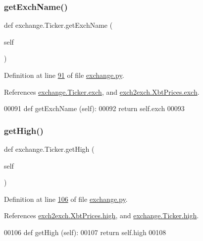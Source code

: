 \subsubsection{\texorpdfstring{get\+Exch\+Name()}{getExchName()}}
{\footnotesize\ttfamily def exchange.\+Ticker.\+get\+Exch\+Name (\begin{DoxyParamCaption}\item[{}]{self }\end{DoxyParamCaption})}



Definition at line \hyperlink{exchange_8py_source_l00091}{91} of file \hyperlink{exchange_8py_source}{exchange.\+py}.



References \hyperlink{exchange_8py_source_l00057}{exchange.\+Ticker.\+exch}, and \hyperlink{exch2exch_8py_source_l00064}{exch2exch.\+Xbt\+Prices.\+exch}.


\begin{DoxyCode}
00091     \textcolor{keyword}{def }getExchName (self):
00092         \textcolor{keywordflow}{return} self.exch
00093         
\end{DoxyCode}
\mbox{\label{classexchange_1_1_ticker_a56eafe93405eb1e7192cc6d0c8497ebc}} 
\subsubsection{\texorpdfstring{get\+High()}{getHigh()}}
{\footnotesize\ttfamily def exchange.\+Ticker.\+get\+High (\begin{DoxyParamCaption}\item[{}]{self }\end{DoxyParamCaption})}



Definition at line \hyperlink{exchange_8py_source_l00106}{106} of file \hyperlink{exchange_8py_source}{exchange.\+py}.



References \hyperlink{exch2exch_8py_source_l00061}{exch2exch.\+Xbt\+Prices.\+high}, and \hyperlink{exchange_8py_source_l00062}{exchange.\+Ticker.\+high}.


\begin{DoxyCode}
00106     \textcolor{keyword}{def }getHigh (self):
00107         \textcolor{keywordflow}{return} self.high
00108     
\end{DoxyCode}
\mbox{\label{classexchange_1_1_ticker_a216982e99134953ee6e65d2243c3d793}} 
